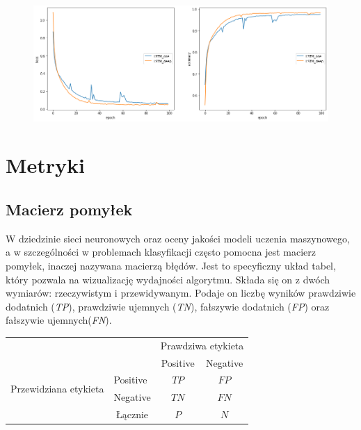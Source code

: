 \begin{figure}[t]
\centering\includegraphics[width=\textwidth]{figures/reports/lstm_one_deep_comparison.png}
\label{rys:lstm_one_deep_comparison}
\end{figure}

\section{Metryki}

\subsection{Macierz pomyłek}

W dziedzinie sieci neuronowych oraz oceny jakości modeli uczenia maszynowego, a w szczególności w problemach klasyfikacji często pomocna jest macierz pomyłek, inaczej nazywana macierzą błędów. Jest to specyficzny układ tabel, który pozwala na wizualizację wydajności algorytmu. Składa się on z dwóch wymiarów: rzeczywistym i przewidywanym. Podaje on liczbę wyników prawdziwie dodatnich (\textit{TP}), prawdziwie ujemnych (\textit{TN}), fałszywie dodatnich (\textit{FP}) oraz fałszywie ujemnych(\textit{FN}).

\begin{table}[ht]
\label{tab:tabela_matrix}
\centering\footnotesize%
\begin{tabular}{l|l|c|c|}
\multicolumn{2}{c}{}&\multicolumn{2}{c}{Prawdziwa etykieta}\\
\cline{3-4}
\multicolumn{2}{c|}{}&Positive&Negative\\
\cline{2-4}
\multirow{2}{*}{Przewidziana etykieta} & Positive & $TP$ & $FP$\\
\cline{2-4}
& Negative & $TN$ & $FN$\\
\cline{2-4}
\multicolumn{1}{c}{} & \multicolumn{1}{c}{Łącznie} & \multicolumn{1}{c}{$P$} & \multicolumn{1}{c}{$N$}\\
\end{tabular}
\end{table}

